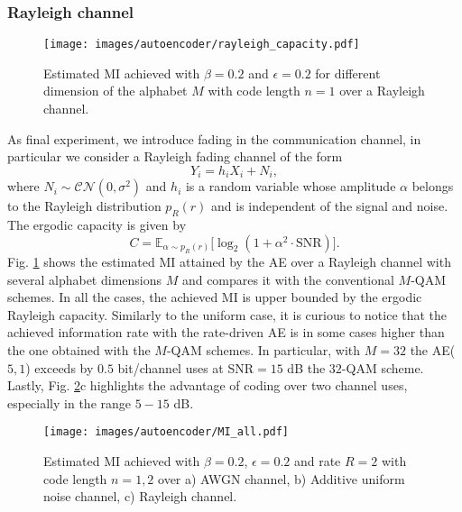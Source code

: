 \subsubsection{Rayleigh channel}
\begin{figure}
	\centering
	\texttt{[image: images/autoencoder/rayleigh\_capacity.pdf]}
	\caption{Estimated MI achieved with $\beta=0.2$ and $\epsilon=0.2$ for different dimension of the alphabet $M$ with code length $n=1$ over a Rayleigh channel.}
	\label{fig:AE_rayleigh_capacity}
\end{figure}
As final experiment, we introduce fading in the communication channel, in particular we consider a Rayleigh fading channel of the form
\begin{equation}
\label{eq:AE_rayleigh_noise}
Y_i=h_iX_i+N_i,
\end{equation}
where $N_i\sim \mathcal{CN}(0,\sigma^2)$ and $h_i$ is a random variable whose amplitude $\alpha$ belongs to the Rayleigh distribution $p_R(r)$ and is independent of the signal and noise. The ergodic capacity is given by
\begin{equation}
C = \mathbb{E}_{\alpha\sim p_R(r)}\biggl[\log_2(1+\alpha ^2 \cdot \text{SNR})\biggr].
\end{equation}
Fig. \ref{fig:AE_rayleigh_capacity} shows the estimated MI attained by the AE over a Rayleigh channel with several alphabet dimensions $M$ and compares it with the conventional $M$-QAM schemes. In all the cases, the achieved MI is upper bounded by the ergodic Rayleigh capacity. Similarly to the uniform case, it is curious to notice that the achieved information rate with the rate-driven AE is in some cases higher than the one obtained with the $M$-QAM schemes.
In particular, with $M=32$ the AE($5,1$) exceeds by $0.5$ bit/channel uses at SNR$=15$ dB the $32$-QAM scheme. Lastly, Fig. \ref{fig:AE_MI_all}c highlights the advantage of coding over two channel uses, especially in the range $5-15$ dB.

\begin{figure}
	\centering
	\texttt{[image: images/autoencoder/MI\_all.pdf]}
	\caption{Estimated MI achieved with $\beta=0.2$, $\epsilon=0.2$ and rate $R=2$ with code length $n=1,2$ over a) AWGN channel, b) Additive uniform noise channel, c) Rayleigh channel.}
	\label{fig:AE_MI_all}
\end{figure}

